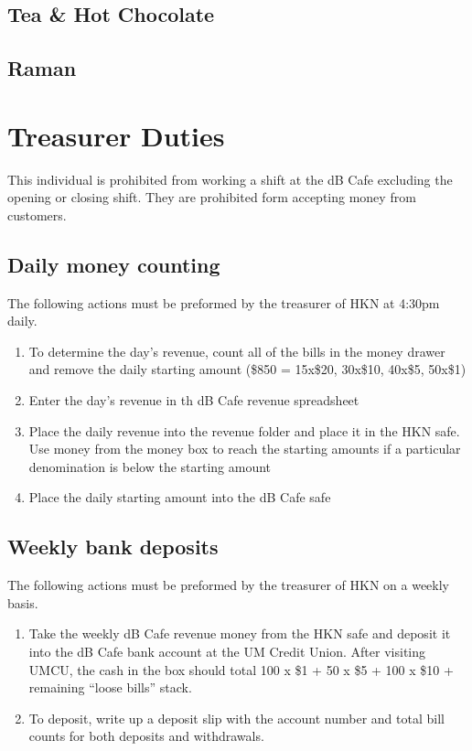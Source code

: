 \documentclass[12pt,onecolumn,letterpaper]{article}
\begin{document}
\subsection{Tea \& Hot Chocolate}
\subsection{Raman}

\section{Treasurer Duties}
This individual is prohibited from working a shift at the dB Cafe excluding the opening or closing shift. They are prohibited form accepting money from customers. 
\subsection{Daily money counting}
The following actions must be preformed by the treasurer of HKN at 4:30pm daily. 
\begin{enumerate}
\item To determine the day's revenue, count all of the bills in the money drawer and remove the daily starting amount (\$850 = 15x\$20, 30x\$10, 40x\$5, 50x\$1)
\item Enter the day's revenue in th dB Cafe revenue spreadsheet 
\item Place the daily revenue into the revenue folder and place it in the HKN safe. Use money from the money box to reach the starting amounts if a particular denomination is below the starting amount
\item Place the daily starting amount into the dB Cafe safe
\end{enumerate}
\subsection{Weekly bank deposits}
The following actions must be preformed by the treasurer of HKN on a weekly basis.
\begin{enumerate}
\item Take the weekly dB Cafe revenue money from the HKN safe and deposit it into the dB Cafe bank account at the UM Credit Union. After visiting UMCU, the cash in the box should total 100 x \$1 + 50 x \$5 + 100 x \$10 + remaining ``loose bills'' stack.
\item To deposit, write up a deposit slip with the account number and total bill counts for both deposits and withdrawals.
\end{enumerate}
\end{document}
